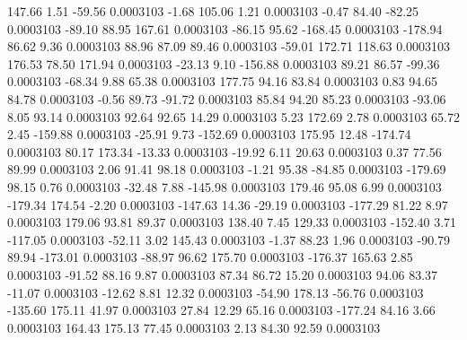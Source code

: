       147.66        1.51      -59.56     0.0003103
       -1.68      105.06        1.21     0.0003103
       -0.47       84.40      -82.25     0.0003103
      -89.10       88.95      167.61     0.0003103
      -86.15       95.62     -168.45     0.0003103
     -178.94       86.62        9.36     0.0003103
       88.96       87.09       89.46     0.0003103
      -59.01      172.71      118.63     0.0003103
      176.53       78.50      171.94     0.0003103
      -23.13        9.10     -156.88     0.0003103
       89.21       86.57      -99.36     0.0003103
      -68.34        9.88       65.38     0.0003103
      177.75       94.16       83.84     0.0003103
        0.83       94.65       84.78     0.0003103
       -0.56       89.73      -91.72     0.0003103
       85.84       94.20       85.23     0.0003103
      -93.06        8.05       93.14     0.0003103
       92.64       92.65       14.29     0.0003103
        5.23      172.69        2.78     0.0003103
       65.72        2.45     -159.88     0.0003103
      -25.91        9.73     -152.69     0.0003103
      175.95       12.48     -174.74     0.0003103
       80.17      173.34      -13.33     0.0003103
      -19.92        6.11       20.63     0.0003103
        0.37       77.56       89.99     0.0003103
        2.06       91.41       98.18     0.0003103
       -1.21       95.38      -84.85     0.0003103
     -179.69       98.15        0.76     0.0003103
      -32.48        7.88     -145.98     0.0003103
      179.46       95.08        6.99     0.0003103
     -179.34      174.54       -2.20     0.0003103
     -147.63       14.36      -29.19     0.0003103
     -177.29       81.22        8.97     0.0003103
      179.06       93.81       89.37     0.0003103
      138.40        7.45      129.33     0.0003103
     -152.40        3.71     -117.05     0.0003103
      -52.11        3.02      145.43     0.0003103
       -1.37       88.23        1.96     0.0003103
      -90.79       89.94     -173.01     0.0003103
      -88.97       96.62      175.70     0.0003103
     -176.37      165.63        2.85     0.0003103
      -91.52       88.16        9.87     0.0003103
       87.34       86.72       15.20     0.0003103
       94.06       83.37      -11.07     0.0003103
      -12.62        8.81       12.32     0.0003103
      -54.90      178.13      -56.76     0.0003103
     -135.60      175.11       41.97     0.0003103
       27.84       12.29       65.16     0.0003103
     -177.24       84.16        3.66     0.0003103
      164.43      175.13       77.45     0.0003103
        2.13       84.30       92.59     0.0003103
